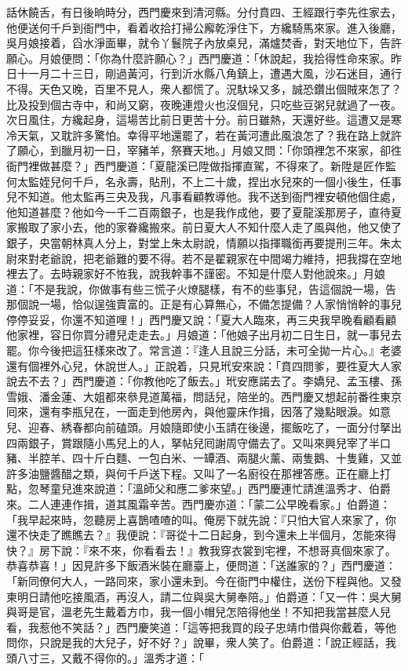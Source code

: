 話休饒舌，有日後晌時分，西門慶來到清河縣。分付賁四、王經跟行李先徃家去，他便送何千戶到衙門中，看着收拾打掃公廨乾淨住下，方纔騎馬來家。進入後廳，吳月娘接着，舀水淨面畢，就令丫鬟院子內放桌兒，滿爐焚香，對天地位下，告許願心。月娘便問：「你為什麼許願心？」西門慶道：「休說起，我拾得性命來家。昨日十一月二十三日，剛過黃河，行到沂水縣八角鎮上，遭遇大風，沙石迷目，通行不得。天色又晚，百里不見人，衆人都慌了。況馱垛又多，誠恐鑽出個賊來怎了？比及投到個古寺中，和尚又窮，夜晚連燈火也沒個兒，只吃些豆粥兒就過了一夜。次日風住，方纔起身，這場苦比前日更苦十分。前日雖熱，天還好些。這遭又是寒冷天氣，又耽許多驚怕。幸得平地還罷了，若在黃河遭此風浪怎了？我在路上就許了願心，{}到臘月初一日，宰豬羊，祭賽天地。」月娘又問：「你頭裡怎不來家，卻徃衙門裡做甚麼？」西門慶道：「夏龍溪已陞做指揮直駕，不得來了。新陞是匠作監何太監姪兒何千戶，名永壽，貼刑，不上二十歲，捏出水兒來的一個小後生，{}任事兒不知道。他太監再三央及我，凡事看顧教導他。我不送到衙門裡安頓他個住處，他知道甚麼？他如今一千二百兩銀子，也是我作成他，要了夏龍溪那房子，直待夏家搬取了家小去，他的家眷纔搬來。前日夏大人不知什麼人走了風與他，他又使了銀子，央當朝林真人分上，對堂上朱太尉說，情願以指揮職銜再要提刑三年。朱太尉來對老爺說，把老爺難的要不得。若不是翟親家在中間竭力維持，把我撐在空地裡去了。去時親家好不恠我，說我幹事不謹密。不知是什麼人對他說來。」月娘道：「不是我說，你做事有些三慌子火燎腿樣，有不的些事兒，告這個說一場，告那個說一場，{}恰似逞強賣富的。正是有心算無心，不備怎提備？人家悄悄幹的事兒停停妥妥，你還不知道哩！」西門慶又說：「夏大人臨來，再三央我早晚看顧看顧他家裡，容日你買分禮兒走走去。」月娘道：「他娘子出月初二日生日，就一事兒去罷。你今後把這狂樣來改了。常言道：『逢人且說三分話，未可全拋一片心。』老婆還有個裡外心兒，{}休說世人。」{}正說着，只見玳安來說：「賁四問爹，要徃夏大人家說去不去？」西門慶道：「你教他吃了飯去。」玳安應諾去了。李嬌兒、孟玉樓、孫雪娥、潘金蓮、大姐都來叅見道萬福，問話兒，陪坐的。西門慶又想起前番徃東京囘來，還有李瓶兒在，一面走到他房內，與他靈床作揖，因落了幾點眼淚。如意兒、迎春、綉春都向前磕頭。月娘隨即使小玉請在後邊，擺飯吃了，一面分付拏出四兩銀子，賞跟隨小馬兒上的人，拏帖兒囘謝周守備去了。又叫來興兒宰了半口豬、半腔羊、四十斤白麵、一包白米、一罈酒、兩腿火薰、兩隻鵝、十隻雞，又並許多油鹽醬醋之類，與何千戶送下程。又叫了一名廚役在那裡答應。正在廳上打點，忽琴童兒進來說道：「溫師父和應二爹來望。」西門慶連忙請進溫秀才、伯爵來。二人連連作揖，道其風霜辛苦。西門慶亦道：「蒙二公早晚看家。」伯爵道：「我早起來時，忽聽房上喜鵲喳喳的叫。{}俺房下就先說：『只怕大官人來家了，你還不快走了瞧瞧去？』我便說：『哥從十二日起身，到今還未上半個月，怎能來得快？』房下說：『來不來，你看看去！』教我穿衣裳到宅裡，不想哥真個來家了。恭喜恭喜！」因見許多下飯酒米裝在廳臺上，便問道：「送誰家的？」西門慶道：「新同僚何大人，一路同來，家小還未到。今在衙門中權住，送份下程與他。又發柬明日請他吃接風酒，再沒人，請二位與吳大舅奉陪。」伯爵道：「又一件：吳大舅與哥是官，溫老先生戴着方巾，我一個小帽兒怎陪得他坐！不知把我當甚麼人兒看，我惹他不笑話？」西門慶笑道：「這等把我買的段子忠靖巾借與你戴着，等他問你，只說是我的大兒子，好不好？」說畢，衆人笑了。伯爵道：「說正經話，我頭八寸三，又戴不得你的。」溫秀才道：「